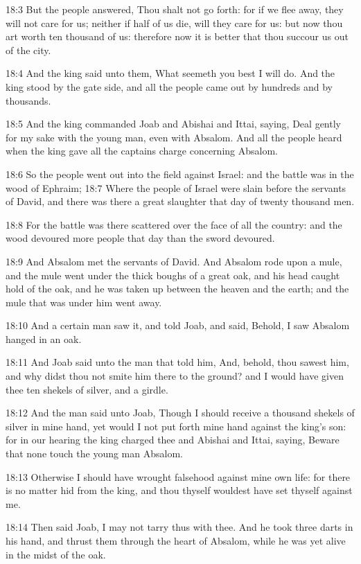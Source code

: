 18:3 But the people answered, Thou shalt not go forth: for if we flee away, they will not care for us; neither if half of us die, will they care for us: but now thou art worth ten thousand of us: therefore now it is better that thou succour us out of the city.

18:4 And the king said unto them, What seemeth you best I will do. And the king stood by the gate side, and all the people came out by hundreds and by thousands.

18:5 And the king commanded Joab and Abishai and Ittai, saying, Deal gently for my sake with the young man, even with Absalom. And all the people heard when the king gave all the captains charge concerning Absalom.

18:6 So the people went out into the field against Israel: and the battle was in the wood of Ephraim; 18:7 Where the people of Israel were slain before the servants of David, and there was there a great slaughter that day of twenty thousand men.

18:8 For the battle was there scattered over the face of all the country: and the wood devoured more people that day than the sword devoured.

18:9 And Absalom met the servants of David. And Absalom rode upon a mule, and the mule went under the thick boughs of a great oak, and his head caught hold of the oak, and he was taken up between the heaven and the earth; and the mule that was under him went away.

18:10 And a certain man saw it, and told Joab, and said, Behold, I saw Absalom hanged in an oak.

18:11 And Joab said unto the man that told him, And, behold, thou sawest him, and why didst thou not smite him there to the ground? and I would have given thee ten shekels of silver, and a girdle.

18:12 And the man said unto Joab, Though I should receive a thousand shekels of silver in mine hand, yet would I not put forth mine hand against the king's son: for in our hearing the king charged thee and Abishai and Ittai, saying, Beware that none touch the young man Absalom.

18:13 Otherwise I should have wrought falsehood against mine own life: for there is no matter hid from the king, and thou thyself wouldest have set thyself against me.

18:14 Then said Joab, I may not tarry thus with thee. And he took three darts in his hand, and thrust them through the heart of Absalom, while he was yet alive in the midst of the oak.

